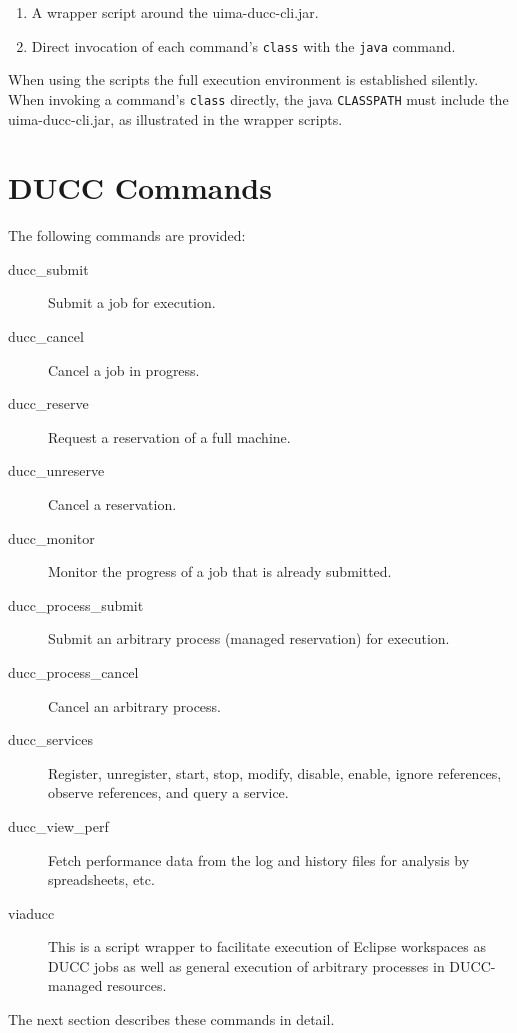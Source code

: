     \begin{enumerate}
      \item A wrapper script around the uima-ducc-cli.jar.
      \item Direct invocation of each command's {\tt class} with the {\tt java} command.
    \end{enumerate}

    When using the scripts the full execution environment is established
    silently.  When invoking a command's {\tt class} directly, the java {\tt CLASSPATH}
    must include the uima-ducc-cli.jar, as illustrated in the wrapper scripts.

    \section{DUCC Commands}
    The following commands are provided:
    \begin{description}
    \item[ducc\_submit] Submit a job for execution.
    \item[ducc\_cancel] Cancel a job in progress.
    \item[ducc\_reserve] Request a reservation of a full machine.
    \item[ducc\_unreserve] Cancel a reservation.
    \item[ducc\_monitor] Monitor the progress of a job that is already submitted.
    \item[ducc\_process\_submit] Submit an arbitrary process (managed reservation) for execution.
    \item[ducc\_process\_cancel] Cancel an arbitrary process.
    \item[ducc\_services] Register, unregister, start, stop, modify, disable, enable, 
      ignore references, observe references, and query a service.
    \item[ducc\_view\_perf] Fetch performance data from the log and history files for analysis
      by spreadsheets, etc.
    \item[viaducc] This is a script wrapper to facilitate execution of Eclipse workspaces as
      DUCC jobs as well as general execution of arbitrary processes in DUCC-managed resources.
    \end{description}
    
    The next section describes these commands in detail.

    
    
    
    
    
    
    
    


